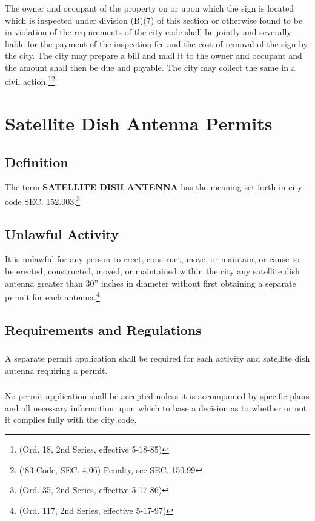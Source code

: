 \subsubsection{}
The owner and occupant of the property on or upon which the sign is located which is inspected under division (B)(7) of this section or otherwise found to be in violation of the requirements of the city code shall be jointly and severally liable for the payment of the inspection fee and the cost of removal of the sign by the city. The city may prepare a bill and mail it to the owner and occupant and the amount shall then be due and payable. The city may collect the same in a civil action.\footnote{(Ord. 18, 2nd Series, effective 5-18-85)}\footnote{(‘83 Code, SEC. 4.06)  Penalty, see SEC. 150.99}

\section{Satellite Dish Antenna Permits}
\subsection{Definition}
The term \textbf{SATELLITE DISH ANTENNA} has the meaning set forth in city code SEC. 152.003.\footnote{(Ord. 35, 2nd Series, effective 5-17-86)}
\subsection{Unlawful Activity}
It is unlawful for any person to erect, construct, move, or maintain, or cause to be erected, constructed, moved, or maintained within the city any satellite dish antenna greater than 30” inches in diameter without first obtaining a separate permit for each antenna.\footnote{(Ord. 117, 2nd Series, effective 5-17-97)}
\subsection{Requirements and Regulations}
\subsubsection{}
A separate permit application shall be required for each activity and satellite dish antenna requiring a permit.
\subsubsection{}
No permit application shall be accepted unless it is accompanied by specific plans and all necessary information upon which to base a decision as to whether or not it complies fully with the city code.
